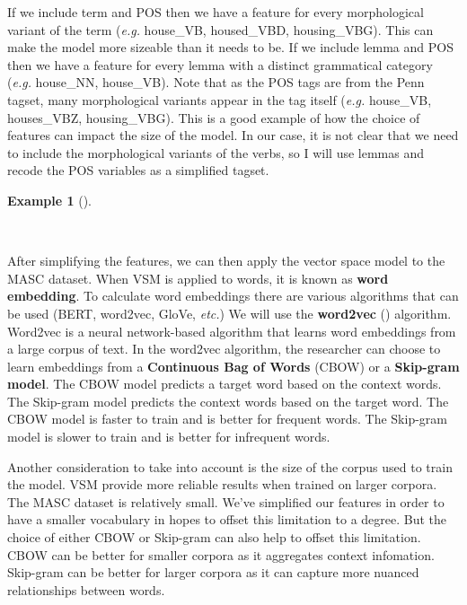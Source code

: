 \documentclass[
  letterpaper,
  DIV=11,
  numbers=noendperiod]{scrreprt}
\theoremstyle{definition}
\newtheorem{example}{Example}[chapter]
\theoremstyle{remark}
\begin{document}
If we include term and POS then we have a feature for every
morphological variant of the term (\emph{e.g.} house\_VB, housed\_VBD,
housing\_VBG). This can make the model more sizeable than it needs to
be. If we include lemma and POS then we have a feature for every lemma
with a distinct grammatical category (\emph{e.g.} house\_NN, house\_VB).
Note that as the POS tags are from the Penn tagset, many morphological
variants appear in the tag itself (\emph{e.g.} house\_VB, houses\_VBZ,
housing\_VBG). This is a good example of how the choice of features can
impact the size of the model. In our case, it is not clear that we need
to include the morphological variants of the verbs, so I will use lemmas
and recode the POS variables as a simplified tagset.

\begin{example}[]\protect\hypertarget{exm-eda-masc-vsm-lemma-pos}{}\label{exm-eda-masc-vsm-lemma-pos}

~

\end{example}

After simplifying the features, we can then apply the vector space model
to the MASC dataset. When VSM is applied to words, it is known as
\textbf{word embedding}. To calculate word embeddings there are various
algorithms that can be used (BERT, word2vec, GloVe, \emph{etc.}) We will
use the \textbf{word2vec} () algorithm. Word2vec is a neural network-based algorithm that
learns word embeddings from a large corpus of text. In the word2vec
algorithm, the researcher can choose to learn embeddings from a
\textbf{Continuous Bag of Words} (CBOW) or a \textbf{Skip-gram model}.
The CBOW model predicts a target word based on the context words. The
Skip-gram model predicts the context words based on the target word. The
CBOW model is faster to train and is better for frequent words. The
Skip-gram model is slower to train and is better for infrequent words.

Another consideration to take into account is the size of the corpus
used to train the model. VSM provide more reliable results when trained
on larger corpora. The MASC dataset is relatively small. We've
simplified our features in order to have a smaller vocabulary in hopes
to offset this limitation to a degree. But the choice of either CBOW or
Skip-gram can also help to offset this limitation. CBOW can be better
for smaller corpora as it aggregates context infomation. Skip-gram can
be better for larger corpora as it can capture more nuanced
relationships between words.
\end{document}
